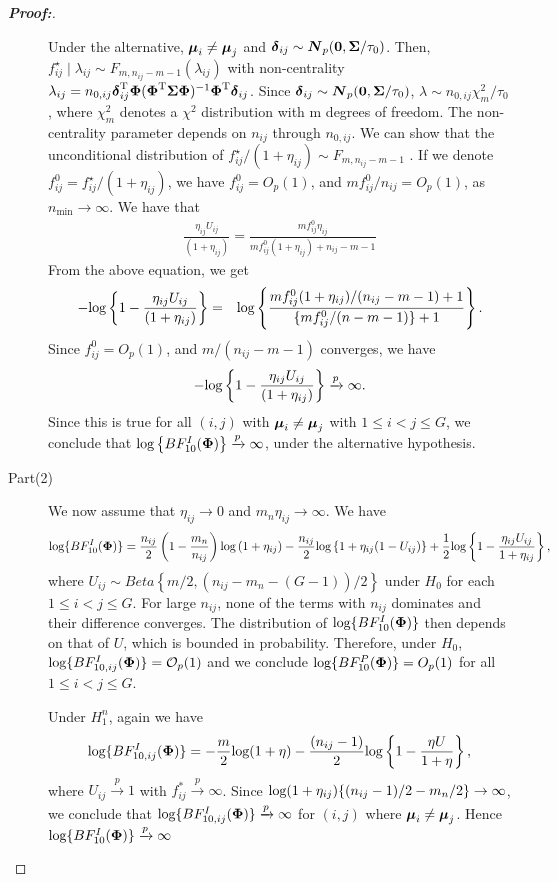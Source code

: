 \documentclass[12pt]{article}
\theoremstyle{plain}%
\theoremstyle{definition}
\def\log{\hbox{log}}
\def\log{\hbox{log}}
\def\bse{\begin{eqnarray*}}
\def\ese{\end{eqnarray*}}
\def\be{\begin{eqnarray}}
\def\ee{\end{eqnarray}}
\def\trans{^{\rm T}}
\newcommand{\uN}       {\mbox{\boldmath$N$}}
\newcommand{\udelta}            {\mbox{\boldmath$\delta$}}
\newcommand{\umu}               {\mbox{\boldmath$\mu$}}
\newcommand{\uSigma}            {\mbox{\boldmath$\Sigma$}}
\newcommand{\uPhi}              {\mbox{\boldmath$\Phi$}}
\begin{document}
\begin{proof}[\textbf{\upshape Proof:}]
\begin{description}
Under the alternative, $\umu_{i} \neq \umu_{j}$ and $\udelta_{ij} \sim \uN_{p}({\bf 0}, \uSigma /\tau_{0})$.
Then, $f_{ij}^{\star} \mid   \lambda_{ij} \sim F_{m, n_{ij}-m-1}(\lambda_{ij})$
with non-centrality $\lambda_{ij} = n_{0,ij}\udelta_{ij}\trans\uPhi(\uPhi\trans \uSigma \uPhi)^{-1}\uPhi\trans \udelta_{ij}$.
Since $\udelta_{ij} \sim \uN_{p}({\bf 0}, \uSigma /\tau_{0})$, $\lambda \sim n_{0,ij}\chi_{m}^{2}/\tau_{0}$,
where $\chi_{m}^{2}$ denotes a $\chi^{2}$ distribution with m degrees of freedom. The non-centrality parameter depends on $n_{ij}$ through $n_{0,ij}$.
We can show that the unconditional distribution of $f_{ij}^{\star} /(1 + \eta_{ij}) \sim F_{m, n_{ij}-m-1}$ \citep[see][page 704]{johnson2005bayes}.
If we denote $f_{ij}^{0} =  f_{ij}^{\star} /(1 + \eta_{ij})$, we have $f_{ij}^{0} = O_{p}(1)$, and $mf_{ij}^{0}/n_{ij} = O_{p}(1)$, as $n_{\min} \rightarrow \infty$.
We have that
\be
\frac{\eta_{ij} U_{ij}}{(1+\eta_{ij})} = \frac{ m f_{ij}^{0}\eta_{ij}}{m f_{ij}^{0}(1+\eta_{ij})+n_{ij}-m-1} \nonumber
\ee
From the above equation, we get
\be
-\log\left\{ 1 - \frac{\eta_{ij} U_{ij}}{(1+\eta_{ij})} \right \} &=& \log\left\{ \frac{mf_{ij}^{0}(1+\eta_{ij})/(n_{ij}-m-1) + 1}{\{mf_{ij}^{0}/(n-m-1)\} +1 }\right\}. \nonumber
\ee
Since $f_{ij}^{0} = O_{p}(1)$, and $m/(n_{ij}-m-1)$ converges, we have
\bse
 -\log\left\{ 1 - \frac{\eta_{ij} U_{ij}}{(1+\eta_{ij})} \right \} \xrightarrow[]{p} \infty.
\ese
Since this is true for all $(i,j)$ with $\umu_i \neq \umu_j$ with $1 \leq i < j \leq G$,  we conclude that $\log\left\{BF^{I}_{10}(\uPhi) \right \} \xrightarrow[]{p} \infty$, under the alternative hypothesis.

\item[Part(2)]
We now assume that $\eta_{ij} \rightarrow 0$ and $m_n \eta_{ij} \rightarrow \infty$. We have
\be
 \log\{BF^{I}_{10}(\uPhi)\} =\frac{n_{ij}}{2}\left( 1 - \frac{m_n}{n_{ij}}\right)\log\left(1 + \eta_{ij} \right) - \frac{n_{ij}}{2}\log\left\{ 1 + \eta_{ij}(1-U_{ij}) \right \} +\frac{1}{2}\log \left\{1 - \frac{\eta_{ij} U_{ij}}{1+\eta_{ij}}\right\},  \nonumber
\ee
where $U_{ij} \sim Beta\left\{ m/2,  (n_{ij} - m_n -(G-1))/2 \right\}$ under $H_0$ for each $1 \leq i < j \leq G$.
For large $n_{ij}$, none of the terms with $n_{ij}$ dominates and their difference converges.
The distribution of $\log\{BF^{I}_{10}(\uPhi) \}$ then depends on that of $U$, which is bounded in probability.
Therefore, under $H_0$, $\log\{BF^{I}_{10, ij}(\uPhi) \} = \mathcal{O}_{p}(1)$ and we conclude $\log\{BF^{P}_{10}(\uPhi) \} = O_{p}(1)$ for all $1 \leq i < j \leq G$.

Under $H^{n}_{1}$, again we have
\be
\log\{BF^{I}_{10,ij}(\uPhi) \} = -\frac{m}{2}\log(1 + \eta) - \frac{(n_{ij}-1)}{2}\log\left\{ 1 - \frac{\eta U}{1 + \eta} \right\}, \nonumber
\ee
where $U_{ij} \xrightarrow[]{p} 1$ with $f_{ij}^{*}\xrightarrow[]{p} \infty$.
Since $\log(1 + \eta_{ij})\{ (n_{ij}-1)/2 - m_n/2\} \rightarrow \infty$, we conclude that $\log\{BF^{I}_{10,ij}(\uPhi) \} \xrightarrow[]{p} \infty $ for $(i,j)$ where $\umu_i \neq \umu_j$. Hence $\log\{BF^{I}_{10}(\uPhi) \} \xrightarrow[]{p} \infty $
\end{description}
\end{proof}
\end{document}
